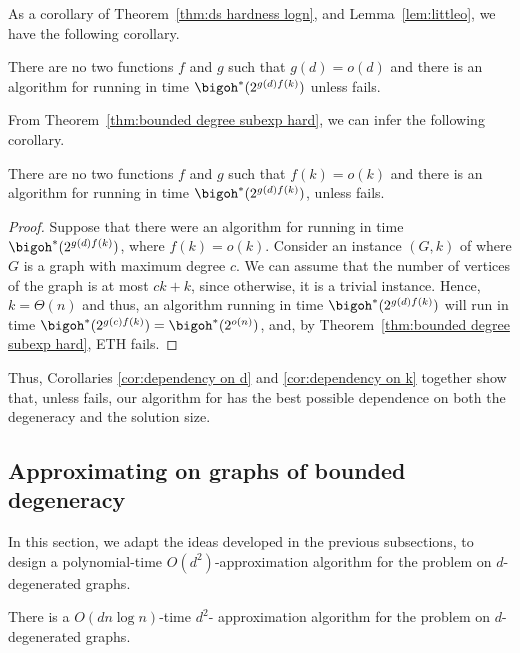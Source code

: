 \noindent
As a corollary of Theorem~\ref{thm:ds hardness logn}, and Lemma~\ref{lem:littleo}, we have the following corollary.



\begin{corollary}\label{cor:dependency on d}
There are no two functions $f$ and $g$ such that $g(d)=o(d)$ and there is an algorithm for {\ds} running in time $\bigoh^*(2^{g(d)f(k)})$ unless {\ETH} fails.
\end{corollary}




\noindent
From Theorem~\ref{thm:bounded degree subexp hard}, we can infer the following corollary.

\begin{corollary}\label{cor:dependency on k}
 There are no two functions $f$ and $g$ such that $f(k)=o(k)$ and there is an algorithm for {\ds} running in time $\bigoh^*(2^{g(d)f(k)})$, unless {\ETH} fails.
\end{corollary}

\begin{proof}
Suppose that there were an algorithm for {\ds} running in time $\bigoh^*(2^{g(d)f(k)})$, where $f(k)=o(k)$. Consider an instance $(G,k)$ of {\ds} where $G$ is a graph with maximum degree $c$. We can assume that the number of vertices of the graph is at most $ck+k$, since otherwise, it is a trivial {\No} instance. Hence, $k=\Theta(n)$ and thus, an algorithm running in time $\bigoh^*(2^{g(d)f(k)})$ will run in time $\bigoh^*(2^{g(c)f(k)})=\bigoh^*(2^{o(n)})$, and, by Theorem~\ref{thm:bounded degree subexp hard}, ETH fails.  
\end{proof}

\noindent
Thus, Corollaries \ref{cor:dependency on d} and \ref{cor:dependency on k} together show that, unless {\ETH} fails, our algorithm for {\ds} has the best possible dependence on both the degeneracy and the solution size.\\



\subsection{Approximating {\ds} on graphs of bounded degeneracy}

In this section, we adapt the ideas developed in the previous subsections, to design a polynomial-time $O(d^2)$-approximation algorithm for the {\ds} problem on $d$-degenerated graphs.

\begin{theorem}\label{thm:approx_ds}
 There is a $O(dn\log n)$-time $d^2$- approximation algorithm for the {\ds} problem on $d$-degenerated graphs. \end{theorem}

